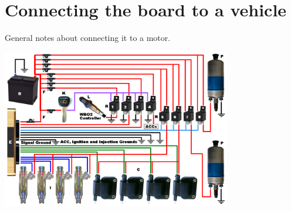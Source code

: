 \section{Connecting the board to a vehicle}

General notes about connecting it to a motor.

\includegraphics[width=10cm]{images/freeems-power-wiring5.png}